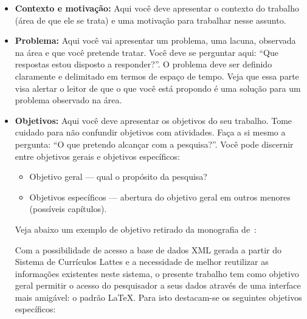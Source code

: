 \begin{itemize}
	\item \textbf{Contexto e motivação:} Aqui você deve apresentar o contexto do trabalho (área de que ele se trata) e uma motivação para trabalhar nesse assunto.
	\item \textbf{Problema:} Aqui você vai apresentar um problema, uma lacuna, observada na área e que você pretende tratar. Você deve se perguntar aqui: ``Que respostas estou disposto a responder?''. O problema deve ser definido claramente e delimitado em termos de espaço de tempo. Veja que essa parte visa alertar o leitor de que o que você está propondo é uma solução para um problema observado na área. 
	\item \textbf{Objetivos:} Aqui você deve apresentar os objetivos do seu trabalho. Tome cuidado para não confundir objetivos com atividades.   Faça a si mesmo a pergunta: ``O que pretendo alcançar com a pesquisa?''. Você pode discernir entre objetivos gerais e objetivos específicos:
	\begin{itemize}
		\item Objetivo geral --- qual o propósito da pesquisa?
		\item Objetivos específicos --- abertura do objetivo geral em outros menores (possíveis capítulos).
	\end{itemize}
	Veja abaixo um exemplo de objetivo retirado da monografia de~:

	Com a possibilidade de acesso a base de dados XML gerada a partir do Sistema de Currículos Lattes e a necessidade de melhor reutilizar as informações existentes neste sistema, o presente trabalho tem como objetivo geral permitir o acesso do pesquisador a seus dados através de uma interface mais amigável: o padrão LaTeX. Para isto destacam-se os seguintes objetivos específicos:
\end{itemize}




